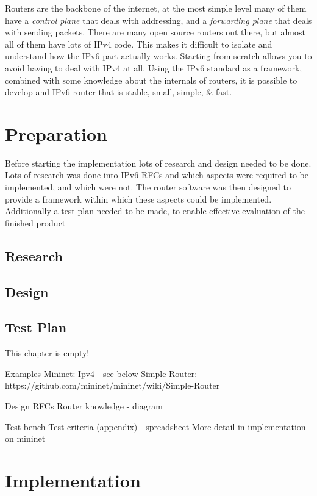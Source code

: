 \documentclass[12pt,a4paper,twoside,openright]{report}
\begin{document}
\bigskip

Routers are the backbone of the internet, at the most simple level many of them have a \textit{control plane} that deals with addressing, and a \textit{forwarding plane} that deals with sending packets. There are many open source routers out there, but almost all of them have lots of IPv4 code. This makes it difficult to isolate and understand how the IPv6 part actually works.  Starting from scratch allows you to avoid having to deal with IPv4 at all.  Using the IPv6 standard as a framework, combined with some knowledge about the internals of routers, it is possible to develop and IPv6 router that is stable, small, simple, \& fast.

\chapter{Preparation}

Before starting the implementation lots of research and design needed to be done. Lots of research was done into IPv6 RFCs and which aspects were required to be implemented, and which were not. The router software was then designed to provide a framework within which these aspects could be implemented.  Additionally a test plan needed to be made, to enable effective evaluation of the finished product

\section{Research}

\section{Design}

\section{Test Plan}

This chapter is empty!

Examples
Mininet: Ipv4 - see below
Simple Router: https://github.com/mininet/mininet/wiki/Simple-Router

Design
RFCs
Router knowledge - diagram

Test bench
Test criteria (appendix) - spreadsheet
More detail in implementation on mininet


\chapter{Implementation}
\end{document}
